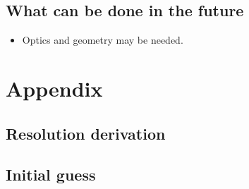 \documentclass{article}
\begin{document}
\subsection{What can be done in the future}
\begin{itemize}
\item Optics and geometry may be needed. 
\end{itemize}

\section{Appendix}
\subsection{Resolution derivation}
\subsection{Initial guess}
\end{document}
